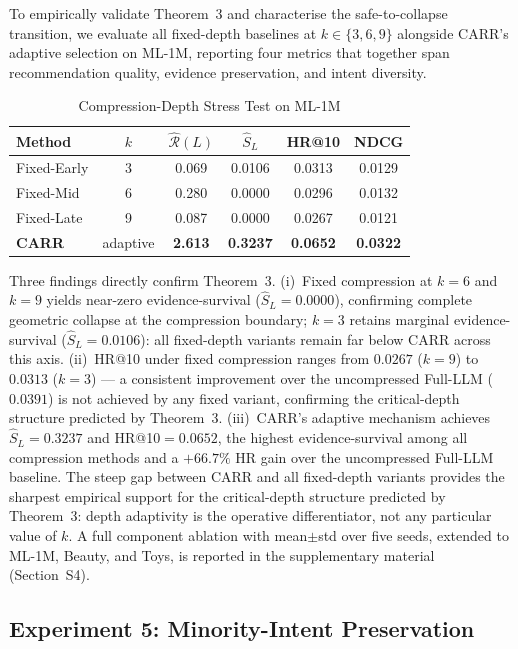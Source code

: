 \documentclass[lettersize,journal]{IEEEtran}
\begin{document}
To empirically validate Theorem~3 and characterise the safe-to-collapse transition, we evaluate all fixed-depth baselines at $k \in \{3, 6, 9\}$ alongside CARR's adaptive selection on ML-1M, reporting four metrics that together span recommendation quality, evidence preservation, and intent diversity.

\begin{table}[!t]
\caption{Compression-Depth Stress Test on ML-1M\label{tab:ablation}}
\centering
\begin{tabular}{l|c|cc|cc}
\toprule
\textbf{Method} & $k$ & $\widehat{\mathcal{R}}(L)$ & $\widehat{S}_L$ & HR@10 & NDCG \\
\midrule
Fixed-Early & 3 & 0.069 & 0.0106 & 0.0313 & 0.0129 \\
Fixed-Mid & 6 & 0.280 & 0.0000 & 0.0296 & 0.0132 \\
Fixed-Late & 9 & 0.087 & 0.0000 & 0.0267 & 0.0121 \\
\textbf{CARR} & adaptive & \textbf{2.613} & \textbf{0.3237} & \textbf{0.0652} & \textbf{0.0322} \\
\bottomrule
\end{tabular}
\end{table}

Three findings directly confirm Theorem~3. (i)~Fixed compression at $k=6$ and $k=9$ yields near-zero evidence-survival ($\widehat{S}_L=0.0000$), confirming complete geometric collapse at the compression boundary; $k=3$ retains marginal evidence-survival ($\widehat{S}_L=0.0106$): all fixed-depth variants remain far below CARR across this axis. (ii)~HR@10 under fixed compression ranges from $0.0267$ ($k=9$) to $0.0313$ ($k=3$) --- a consistent improvement over the uncompressed Full-LLM ($0.0391$) is not achieved by any fixed variant, confirming the critical-depth structure predicted by Theorem~3. (iii)~CARR's adaptive mechanism achieves $\widehat{S}_L=0.3237$ and HR@10$=0.0652$, the highest evidence-survival among all compression methods and a $+66.7\%$ HR gain over the uncompressed Full-LLM baseline. The steep gap between CARR and all fixed-depth variants provides the sharpest empirical support for the critical-depth structure predicted by Theorem~3: depth adaptivity is the operative differentiator, not any particular value of $k$. A full component ablation with mean$\pm$std over five seeds, extended to ML-1M, Beauty, and Toys, is reported in the supplementary material (Section~S4).

\subsection{Experiment 5: Minority-Intent Preservation}
\end{document}
